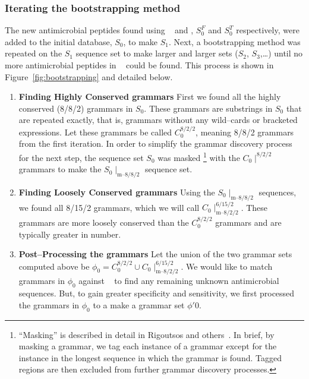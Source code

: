         \subsubsection{Iterating the bootstrapping
            method} The new antimicrobial
            peptides found using \Fasta~ and
            \Teiresias, $S_0^F$ and $S_0^T$
            respectively, were added to the
            initial database, $S_0$, to make
            $S_1$.  Next, a bootstrapping
            method was repeated on the $S_1$
            sequence set to make larger and
            larger sets ($S_2$, $S_3$,\dots)
            until no more antimicrobial
            peptides in \sptr~ could be found.
        This process is shown in Figure~\ref{fig:bootstrapping} and detailed below.
        \begin{enumerate}
            \item \textbf{Finding Highly Conserved grammars}\newline
                First we found all the highly conserved (8/8/2) grammars
                in $S_0$.  These grammars are substrings
                in $S_0$ that are repeated exactly, that is, grammars
                without any wild--cards or bracketed expressions.  Let
                these grammars be called $C_0^{8/2/2}$, meaning
                8/8/2 grammars from the first iteration.  In
                order to simplify the grammar discovery process
                for the next step, the sequence set $S_0$ was
                masked
                \footnote{``Masking'' is described in detail
                    in Rigoutsos and others~\cite{rigoutsos1999dictionary}.  In brief,
                    by masking a grammar, we tag each instance of a grammar
                    except for the instance in the longest sequence in
                    which the grammar is found.  Tagged regions are
                    then excluded from further grammar discovery processes.  }
                with the  $C_0\mid^{8/2/2}$ grammars
                to make the $S_0\mid_{\textrm{m--}8/8/2}$ sequence set.
            \item \textbf{Finding Loosely Conserved grammars}\newline
                Using the $S_0\mid_{\textrm{m--}8/8/2}$ sequences, we
                found all 8/15/2 grammars, which we will call
                $C_0\mid_{\textrm{m--}8/2/2}^{6/15/2}$.
                These grammars are more loosely conserved than the $C_0^{8/2/2}$
                grammars and are typically greater in number.
            \item \textbf{Post--Processing the grammars}\newline
                Let the union of the two grammar sets computed
                above be  $\phi_0 = C_0^{8/2/2} \cup C_0\mid_{\textrm{m--}8/2/2}^{6/15/2}$.
                We would like to match grammars in $\phi_0$ against \sptr~ to find
                any remaining unknown antimicrobial sequences.  But, to gain greater
                specificity and sensitivity, we first processed the grammars in
                $\phi_0$ to a make a grammar set $\phi'0$.


\end{enumerate}
